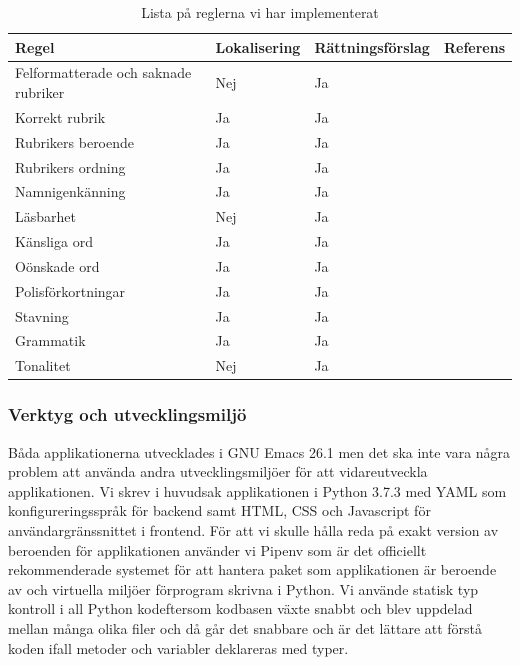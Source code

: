 \documentclass[swedish]{maucsthesis}
\begin{document}
\begin{table}[H]
\centering
\begin{tabular}{|l|l|l|l|}
\hline
Regel                                & Lokalisering & Rättningsförslag & Referens \\ \hline
Felformatterade och saknade rubriker & Nej          & Ja               &          \\ \hline
Korrekt rubrik                       & Ja           & Ja               &          \\ \hline
Rubrikers beroende                   & Ja           & Ja               &          \\ \hline
Rubrikers ordning                    & Ja           & Ja               &          \\ \hline
Namnigenkänning                      & Ja           & Ja               &          \\ \hline
Läsbarhet                            & Nej          & Ja               &          \\ \hline
Känsliga ord                         & Ja           & Ja               &          \\ \hline
Oönskade ord                         & Ja           & Ja               &          \\ \hline
Polisförkortningar                   & Ja           & Ja               &          \\ \hline
Stavning                             & Ja           & Ja               &          \\ \hline
Grammatik                            & Ja           & Ja               &          \\ \hline
Tonalitet                            & Nej          & Ja               &          \\ \hline
\end{tabular}
\caption{Lista på reglerna vi har implementerat}
\label{rulestable}
\end{table}

\subsubsection{Verktyg och utvecklingsmiljö}

Båda applikationerna utvecklades i GNU Emacs 26.1 men det ska inte vara några
problem att använda andra utvecklingsmiljöer för att vidareutveckla
applikationen. Vi skrev i huvudsak applikationen i Python 3.7.3 med YAML som
konfigureringsspråk för backend samt HTML, CSS och Javascript för
användargränssnittet i frontend. För att vi skulle hålla reda på exakt version
av beroenden för applikationen använder vi Pipenv som är det officiellt
rekommenderade systemet för att hantera paket som applikationen är beroende av 
och virtuella miljöer förprogram skrivna i Python. Vi använde statisk typ 
kontroll i all Python kodeftersom kodbasen växte snabbt och blev uppdelad mellan 
många olika filer och då går det snabbare och är det lättare att förstå koden 
ifall metoder och variabler deklareras med typer.
\end{document}

